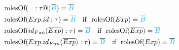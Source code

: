 \documentclass[11pt]{jarticle}
\begin{document}
\begin{alignat*}{2}
  &&&\text{rolesOf}(\_:\tau@(\overline{\color{cyan}B}) = {\overline{\color{cyan}B}}\\
  &&&\text{rolesOf}(Exp.id:\tau) = \overline{\color{cyan}B} ~~~\text{if}~~ \text{rolesOf}(Exp)=\overline{\color{cyan}B}\\
  &&&\text{rolesOf}(id_{Fun}(\overline{Exp}):\tau) = \overline{\color{cyan}B}~~~\text{if}~~\text{rolesOf}(\overline{Exp})=\overline{\color{cyan}B}\\
  &&&\text{rolesOf}(Exp.id_{Fun}(\overline{Exp}):\tau) = \overline{\color{cyan}B}~~~\text{if}~~\text{rolesOf}(Exp)=\overline{\color{cyan}B}\\
\end{alignat*}
\end{document}
